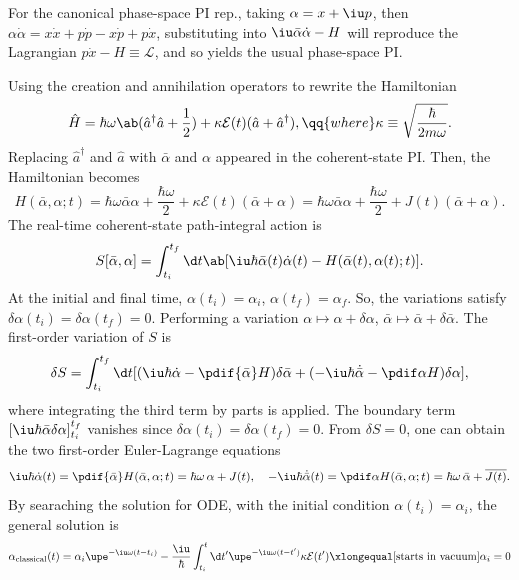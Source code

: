 \begin{solution}
\begin{enumext}
    For the canonical phase-space PI rep., taking $\alpha = x + \iu p$, then
    $\alpha \dot\alpha = x\dot x + p\dot p - x\dot p + p\dot x$,
    substituting into $\iu\bar\alpha \dot\alpha - H$ will reproduce the
    Lagrangian $p\dot x - H \equiv \mathcal L$, and so yields the usual
    phase-space PI.
    \item Using the creation and annihilation operators to rewrite
    the Hamiltonian
    \[
      \hat H = \hbar \omega\ab(\hat a^\dagger \hat a + \frac12)
        + \kappa \mathcal E(t) (\hat a + \hat a^\dagger),
      \qq{where} \kappa \equiv \sqrt{\frac{\hbar}{2m\omega}}.
    \]
    Replacing $\hat a^\dagger$ and $\hat a$ with $\bar \alpha$ and $\alpha$
    appeared in the coherent-state PI. Then, the Hamiltonian becomes
    \[
      H(\bar\alpha, \alpha; t)
    = \hbar\omega \bar\alpha\alpha + \frac{\hbar\omega}{2}
      + \kappa \mathcal E(t) (\bar\alpha+\alpha)
    = \hbar\omega \bar\alpha\alpha + \frac{\hbar\omega}{2}
      + J(t)(\bar\alpha + \alpha).
    \]
    The real-time coherent-state path-integral action is
    \[
      S[\bar\alpha, \alpha] = \int_{t_i}^{t_f} \d t
        \ab[\iu \hbar \bar\alpha(t) \dot\alpha(t)
        - H(\bar\alpha(t), \alpha(t); t)].
    \]
    At the initial and final time, $\alpha(t_i) = \alpha_i$,
    $\alpha(t_f) = \alpha_f$. So, the variations satisfy
    $\delta\alpha(t_i) = \delta\alpha(t_f) = 0$.
    Performing a variation $\alpha \mapsto \alpha + \delta\alpha$,
    $\bar\alpha \mapsto \bar\alpha + \delta\bar\alpha$.
    The first-order variation of $S$ is
    \[
      \delta S
    = \int_{t_i}^{t_f} \d t
      [(\iu\hbar \dot\alpha - \pdif{\bar\alpha}H) \delta\bar\alpha
      + (-\iu\hbar \dot{\bar\alpha} - \pdif \alpha H) \delta\alpha],
    \]
    where integrating the third term by parts is applied.
    The boundary term $[\iu\hbar \bar\alpha \delta\alpha]_{t_i}^{t_f}$
    vanishes since $\delta\alpha(t_i) = \delta\alpha(t_f) = 0$.
    From $\delta S = 0$, one can obtain the two first-order
    Euler-Lagrange equations
    \[
      \iu\hbar \dot\alpha(t) = \pdif{\bar\alpha} H(\bar\alpha, \alpha; t)
    = \hbar\omega\,\alpha + J(t),\quad
      -\iu\hbar \dot{\bar\alpha}(t) = \pdif\alpha H(\bar\alpha, \alpha; t)
    = \hbar\omega\,\bar\alpha + \overline{J(t)}.
    \]
    By searaching the solution for ODE, with the initial
    condition $\alpha(t_i) = \alpha_i$, the general solution is
    \[
      \alpha_\text{classical}(t)
    = \alpha_i \upe^{-\iu\omega (t-t_i)}
    - \frac\iu\hbar \int_{t_i}^{t} \d t'
      \upe^{-\iu\omega(t-t')} \kappa\mathcal E(t')
    \xlongequal[\text{starts in vacuum}]{\alpha_i = 0}
\]
\end{enumext}
\end{solution}
